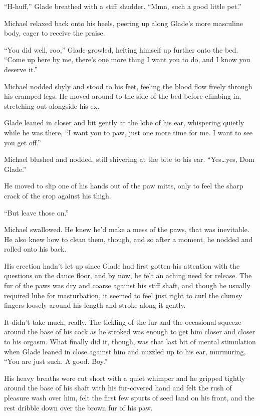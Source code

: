 ``H-huff,'' Glade breathed with a stiff shudder.  ``Mmn, such a good little pet.''

Michael relaxed back onto his heels, peering up along Glade's more masculine body, eager to receive the praise.

``You did well, roo,'' Glade growled, hefting himself up further onto the bed.  ``Come up here by me, there's one more thing I want you to do, and I know you deserve it.''

Michael nodded shyly and stood to his feet, feeling the blood flow freely through his cramped legs.  He moved around to the side of the bed before climbing in, stretching out alongside his ex.

Glade leaned in closer and bit gently at the lobe of his ear, whispering quietly while he was there, ``I want you to paw, just one more time for me. I want to see you get off.''

Michael blushed and nodded, still shivering at the bite to his ear.  ``Yes\ldots{}yes, Dom Glade.''

He moved to slip one of his hands out of the paw mitts, only to feel the sharp crack of the crop against his thigh.

``But leave those on.''

Michael swallowed.  He knew he'd make a mess of the paws, that was inevitable.  He also knew how to clean them, though, and so after a moment, he nodded and rolled onto his back.

His erection hadn't let up since Glade had first gotten his attention with the questions on the dance floor, and by now, he felt an aching need for release.  The fur of the paws was dry and coarse against his stiff shaft, and though he usually required lube for masturbation, it seemed to feel just right to curl the clumsy fingers loosely around his length and stroke along it gently.

It didn't take much, really.  The tickling of the fur and the occasional squeeze around the base of his cock as he stroked was enough to get him closer and closer to his orgasm.  What finally did it, though, was that last bit of mental stimulation when Glade leaned in close against him and nuzzled up to his ear, murmuring, ``You are just such. A good. Boy.''

His heavy breaths were cut short with a quiet whimper and he gripped tightly around the base of his shaft with his fur-covered hand and felt the rush of pleasure wash over him, felt the first few spurts of seed land on his front, and the rest dribble down over the brown fur of his paw.

